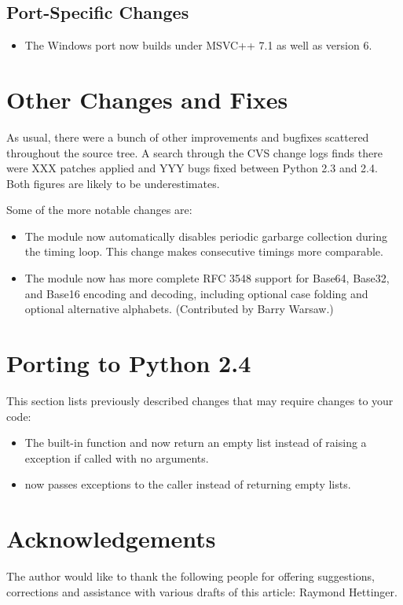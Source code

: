 \documentclass{howto}
\begin{document}
\subsection{Port-Specific Changes}

\begin{itemize}

\item The Windows port now builds under MSVC++ 7.1 as well as version 6.

\end{itemize}


\section{Other Changes and Fixes \label{section-other}}

As usual, there were a bunch of other improvements and bugfixes
scattered throughout the source tree.  A search through the CVS change
logs finds there were XXX patches applied and YYY bugs fixed between
Python 2.3 and 2.4.  Both figures are likely to be underestimates.

Some of the more notable changes are:

\begin{itemize}

\item The  module now automatically disables periodic
  garbarge collection during the timing loop.  This change makes
  consecutive timings more comparable.

\item The  module now has more complete RFC 3548 support
  for Base64, Base32, and Base16 encoding and decoding, including
  optional case folding and optional alternative alphabets.
  (Contributed by Barry Warsaw.)

\end{itemize}


\section{Porting to Python 2.4}

This section lists previously described changes that may require
changes to your code:

\begin{itemize}

\item The  built-in function and 
  now return  an empty list instead of raising a 
  exception if called with no arguments.

\item {} now passes exceptions to the caller
      instead of returning empty lists.

\end{itemize}


\section{Acknowledgements \label{acks}}

The author would like to thank the following people for offering
suggestions, corrections and assistance with various drafts of this
article: Raymond Hettinger.
\end{document}

